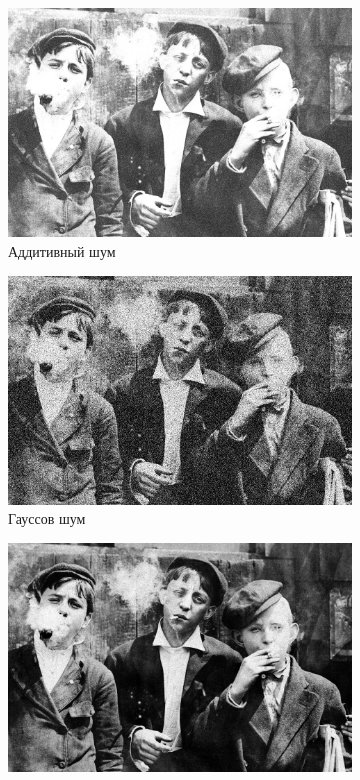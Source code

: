 \begin{figure}[ht!]
  \begin{subfigure}[b]{0.5\linewidth}
    \centering
    \includegraphics[width=0.95\linewidth]{../Adaptive_Median_Filter/Adaptive_Median_Additive_noise_k=3.jpg} 
    \caption{Аддитивный шум} 
    \vspace{4ex}
  \end{subfigure}%
  \begin{subfigure}[b]{0.5\linewidth}
    \centering
    \includegraphics[width=0.95\linewidth]{../Adaptive_Median_Filter/Adaptive_Median_Gaussian_noise_k=3.jpg} 
    \caption{Гауссов шум} 
    \vspace{4ex}
  \end{subfigure}
  \begin{subfigure}[b]{0.5\linewidth}
    \centering
    \includegraphics[width=0.95\linewidth]{../Adaptive_Median_Filter/Adaptive_Median_Poisson_noise_k=3.jpg} 

\end{subfigure}
\end{figure}
